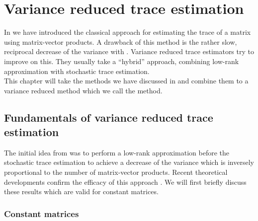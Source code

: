\chapter{Variance reduced trace estimation}
\label{chp:4-nystromchebyshev}

In  we have introduced the
classical approach for estimating the trace of a matrix using matrix-vector
products. A drawback of this method is the rather slow, reciprocal decrease of
the variance with . Variance reduced trace estimators
try to improve on this. They usually take a \enquote{hybrid} approach, combining
low-rank approximation with stochastic trace estimation.\\

This chapter will take the methods we have discussed in 
and  combine them to a variance reduced method which
we call the  method.


\section{Fundamentals of variance reduced trace estimation}
\label{sec:4-nystromchebyshev-hybrid}

The initial idea from \cite{lin2017randomized} was to perform a low-rank
approximation before the stochastic trace estimation to achieve a
decrease of the variance which is inversely proportional to the number of
matrix-vector products. Recent theoretical developments confirm the
efficacy of this approach \cite{meyer2021hutch,persson2022hutch}.
We will first briefly discuss these results which are valid 
for constant matrices.\\

\subsection{Constant matrices}
\label{subsec:4-nystromchebyshev-reduction-constant-matrices}


